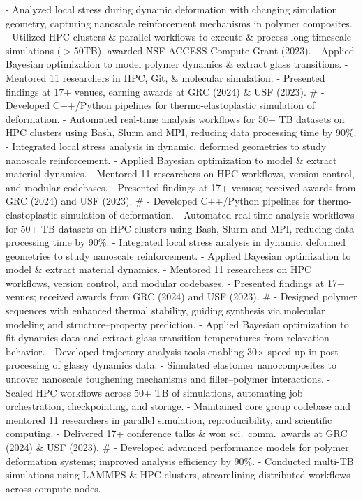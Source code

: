 - Analyzed local stress during dynamic deformation with changing simulation geometry, capturing nanoscale reinforcement mechanisms in polymer composites.
- Utilized HPC clusters \& parallel workflows to execute \& process long-timescale simulations ($>$50TB), awarded NSF ACCESS Compute Grant (2023).
- Applied Bayesian optimization to model polymer dynamics \& extract glass transitions.
- Mentored 11 researchers in HPC, Git, \& molecular simulation.
- Presented findings at 17+ venues, earning awards at GRC (2024) \& USF (2023).
#
- Developed C++/Python pipelines for thermo-elastoplastic simulation of deformation.
- Automated real-time analysis workflows for 50+ TB datasets on HPC clusters using Bash, Slurm and MPI, reducing data processing time by 90\%.
- Integrated local stress analysis in dynamic, deformed geometries to study nanoscale reinforcement.
- Applied Bayesian optimization to model \& extract material dynamics.
- Mentored 11 researchers on HPC workflows, version control, and modular codebases.
- Presented findings at 17+ venues; received awards from GRC (2024) and USF (2023).
#
- Developed C++/Python pipelines for thermo-elastoplastic simulation of deformation.
- Automated real-time analysis workflows for 50+ TB datasets on HPC clusters using Bash, Slurm and MPI, reducing data processing time by 90\%.
- Integrated local stress analysis in dynamic, deformed geometries to study nanoscale reinforcement.
- Applied Bayesian optimization to model \& extract material dynamics.
- Mentored 11 researchers on HPC workflows, version control, and modular codebases.
- Presented findings at 17+ venues; received awards from GRC (2024) and USF (2023).
#
- Designed polymer sequences with enhanced thermal stability, guiding synthesis via molecular modeling and structure–property prediction.
- Applied Bayesian optimization to fit dynamics data and extract glass transition temperatures from relaxation behavior.
- Developed trajectory analysis tools enabling 30$\times$ speed-up in post-processing of glassy dynamics data.
- Simulated elastomer nanocomposites to uncover nanoscale toughening mechanisms and filler–polymer interactions.
- Scaled HPC workflows across 50+ TB of simulations, automating job orchestration, checkpointing, and storage.
- Maintained core group codebase and mentored 11 researchers in parallel simulation, reproducibility, and scientific computing.
- Delivered 17+ conference talks \& won sci.~comm.~awards at GRC (2024) \& USF (2023).
#
- Developed advanced performance models for polymer deformation systems; improved analysis efficiency by 90\%.
- Conducted multi-TB simulations using LAMMPS \& HPC clusters, streamlining distributed workflows across compute nodes.
